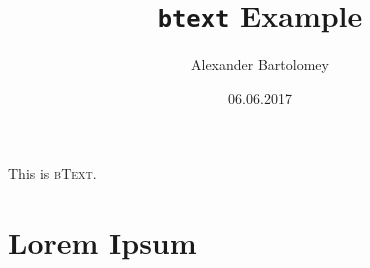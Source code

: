 \documentclass{btext}
\title{\texttt{btext} Example}
\author{Alexander Bartolomey}
\date{06.06.2017}
\begin{document}
\maketitle
This is \textsc{bText}.
\section{Lorem Ipsum}
\lipsum[1-13]
\end{document}
